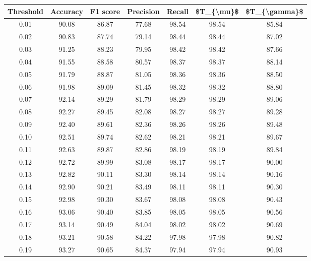 \begin{tabular}{|c|c|c|c|c|c|c|}
\hline
 Threshold &  Accuracy &  F1 score &  Precision &  Recall &  \$T\_\{\textbackslash mu\}\$ &  \$T\_\{\textbackslash gamma\}\$ \\
\hline
      0.01 &     90.08 &     86.87 &      77.68 &   98.54 &      98.54 &         85.84 \\
      0.02 &     90.83 &     87.74 &      79.14 &   98.44 &      98.44 &         87.02 \\
      0.03 &     91.25 &     88.23 &      79.95 &   98.42 &      98.42 &         87.66 \\
      0.04 &     91.55 &     88.58 &      80.57 &   98.37 &      98.37 &         88.14 \\
      0.05 &     91.79 &     88.87 &      81.05 &   98.36 &      98.36 &         88.50 \\
      0.06 &     91.98 &     89.09 &      81.45 &   98.32 &      98.32 &         88.80 \\
      0.07 &     92.14 &     89.29 &      81.79 &   98.29 &      98.29 &         89.06 \\
      0.08 &     92.27 &     89.45 &      82.08 &   98.27 &      98.27 &         89.28 \\
      0.09 &     92.40 &     89.61 &      82.36 &   98.26 &      98.26 &         89.48 \\
      0.10 &     92.51 &     89.74 &      82.62 &   98.21 &      98.21 &         89.67 \\
      0.11 &     92.63 &     89.87 &      82.86 &   98.19 &      98.19 &         89.84 \\
      0.12 &     92.72 &     89.99 &      83.08 &   98.17 &      98.17 &         90.00 \\
      0.13 &     92.82 &     90.11 &      83.30 &   98.14 &      98.14 &         90.16 \\
      0.14 &     92.90 &     90.21 &      83.49 &   98.11 &      98.11 &         90.30 \\
      0.15 &     92.98 &     90.30 &      83.67 &   98.08 &      98.08 &         90.43 \\
      0.16 &     93.06 &     90.40 &      83.85 &   98.05 &      98.05 &         90.56 \\
      0.17 &     93.14 &     90.49 &      84.04 &   98.02 &      98.02 &         90.69 \\
      0.18 &     93.21 &     90.58 &      84.22 &   97.98 &      97.98 &         90.82 \\
      0.19 &     93.27 &     90.65 &      84.37 &   97.94 &      97.94 &         90.93 \\

\end{tabular}
